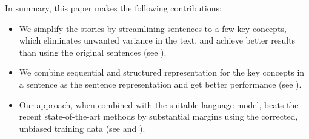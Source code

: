 In summary, this paper makes the following contributions:
\begin{itemize}
\item We simplify the stories by streamlining sentences to a few
key concepts, which eliminates unwanted variance in the text,
and achieve better results than
using the original sentences (see ).
\item We combine sequential and structured representation for the key concepts
in a sentence as the sentence representation
and get better performance (see ).
\item %
Our approach, when combined with 
the suitable language model, beats the recent state-of-the-art methods by
substantial margins using the corrected, unbiased training data (see 
and ).
\end{itemize}

